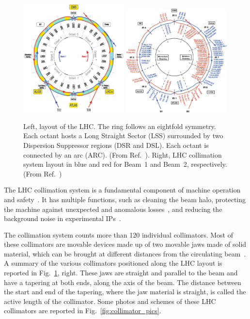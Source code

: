 \begin{figure}[thp]
    \centering
    \includegraphics[width=0.49\textwidth]{5_Diffusion_measurement_LHC/figs/layout.png}
    \includegraphics[width=0.49\textwidth]{5_Diffusion_measurement_LHC/figs/coll_scheme.png}
    \caption{Left, layout of the LHC. The ring follows an eightfold symmetry. Each octant hosts a Long Straight Sector (LSS) surrounded by two Dispersion Suppressor regions (DSR and DSL). Each octant is connected by an arc (ARC). (From Ref.~\cite{Bruning:782076}). Right, LHC collimation system layout in blue and red for Beam~1 and Beam~2, respectively. (From Ref.~\cite{azzopardi:crosstalk})}
    \label{fig:lhc_layout}
\end{figure}

The LHC collimation system is a fundamental component of machine operation and safety~\cite{1590664, Assmann:972336}. It has multiple functions, such as cleaning the beam halo, protecting the machine against unexpected and anomalous losses~\cite{BRUCE201719}, and reducing the background noise in experimental IPs~\cite{Bruce:1646958, Bruce:2686581}.

The collimation system counts more than 120 individual collimators. Most of these collimators are movable devices made up of two movable jaws made of solid material, which can be brought at different distances from the circulating beam~\cite{Bertarelli:794628}. A summary of the various collimators positioned along the LHC layout is reported in Fig.~\ref{fig:lhc_layout}, right. These jaws are straight and parallel to the beam and have a tapering at both ends, along the axis of the beam. The distance between the start and end of the tapering, where the jaw material is straight, is called the active length of the collimator. Some photos and schemes of these LHC collimators are reported in Fig.~\ref{fig:collimator_pics}.

